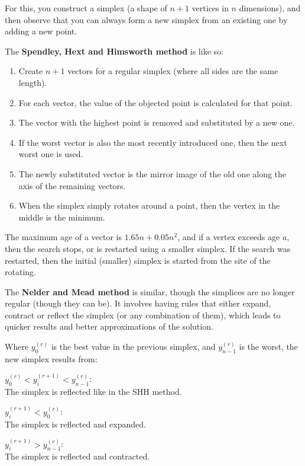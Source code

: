 \begin{description}
    For this, you construct a simplex (a shape of $n+1$ vertices in $n$
    dimensions), and then observe that you can always form a new simplex from an
    existing one by adding a new point.

    The \textbf{Spendley, Hext and Himsworth method} is like so:

    \begin{enumerate}
      \item Create $n+1$ vectors for a regular simplex (where all sides are the
      same length).
      \item For each vector, the value of the objected point is calculated for
      that point.
      \item The vector with the highest point is removed and substituted by a 
      new one.
      \item If the worst vector is also the most recently introduced one, then
      the next worst one is used.
      \item The newly substituted vector is the mirror image of the old one
      along the axis of the remaining vectors. %
      \item When the simplex simply rotates around a point, then
      the vertex in the middle is the minimum.
    \end{enumerate}

    The maximum age of a vector is $1.65n + 0.05 n^2$, and if a vertex exceeds
    age $a$, then the search stops, or is restarted using a smaller simplex.
    If the search was restarted, then the initial (smaller) simplex is started
    from the site of the rotating.

    The \textbf{Nelder and Mead method} is similar, though the simplices are no
    longer regular (though they can be). It involves having rules that either
    expand, contract or reflect the simplex (or any combination of them), which
    leads to quicker results and better approximations of the solution.

    Where $y^{(r)}_0$ is the best value in the previous simplex, and
    $y^{(r)}_{n-1}$ is the worst, the new simplex results from:

    \begin{description}
      \item $y^{(r)}_0 < y^{(r+1)}_{i} < y^{(r)}_{n-1}$:\\
        The simplex is reflected like in the SHH method.
      \item $y^{(r+1)}_{i} < y^{(r)}_{0}$:\\
        The simplex is reflected and expanded.
      \item $y^{(r+1)}_{i} > y^{(r)}_{n-1}$:\\
        The simplex is reflected and contracted.
    \end{description}
\end{description}

